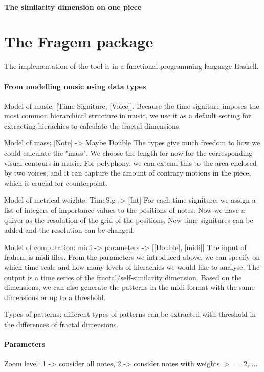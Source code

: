 \documentclass[acmsmall,review,anonymous]{acmart}\settopmatter{printfolios=true,printccs=false,printacmref=false}
\begin{document}
\paragraph{The similarity dimension on one piece}

\section{The Fragem package}
The implementation of the tool is in a functional programming language Haskell.

\paragraph{From modelling music using data types}

Model of music: [Time Signiture, [Voice]]. Because the time signiture imposes
the most common hierarchical structure in music, we use it as a default setting
for extracting hierachies to calculate the fractal dimensions. 

Model of mass: [Note] -> Maybe Double
The types give much freedom to how we could calculate the "mass". We choose the length for now for the corresponding visual contours in music. For polyphony, we can extend this to the area enclosed by two voices, and it can capture the amount of contrary motions in the piece, which is crucial for counterpoint.

Model of metrical weights: TimeSig -> [Int]
For each time signiture, we assign a list of integers of importance values to the positions of notes. Now we have a quiver as the resolution of the grid of the positions. New time signitures can be added and the resolution can be changed.

Model of computation: midi -> parameters -> [[Double], [midi]]
The input of frahem is midi files. From the parameters we introduced above, we can specify on which time scale and how many levels of hierachies we would like to analyse. The output is a time series of the fractal/self-similarity dimension. Based on the dimensions, we can also generate the patterns in the midi format with the same dimensions or up to a threshold.

Types of patterns: different types of patterns can be extracted with threshold
in the differences of fractal dimensions. 

\paragraph{Parameters}
Zoom level: 1 -> consider all notes, 2 -> consider notes with weights $>=$ 2,
...
\end{document}
